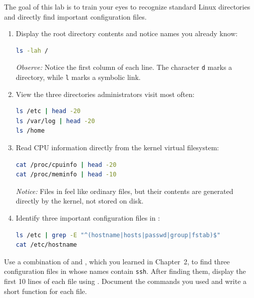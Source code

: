 The goal of this lab is to train your eyes to recognize standard Linux directories and directly find important configuration files.

\begin{enumerate}
    \item Display the root directory contents and notice names you already know:
\begin{lstlisting}[language=bash, caption={Viewing the root filesystem contents}]
ls -lah /
\end{lstlisting}
    \textit{Observe:} Notice the first column of each line. The character \texttt{d} marks a directory, while \texttt{l} marks a symbolic link.

    \item View the three directories administrators visit most often:
\begin{lstlisting}[language=bash, caption={Inspecting /etc, /var/log, and /home}]
ls /etc | head -20
ls /var/log | head -20
ls /home
\end{lstlisting}

    \item Read CPU information directly from the kernel virtual filesystem:
\begin{lstlisting}[language=bash, caption={Reading system information from /proc}]
cat /proc/cpuinfo | head -20
cat /proc/meminfo | head -10
\end{lstlisting}
    \textit{Notice:} Files in  feel like ordinary files, but their contents are generated directly by the kernel, not stored on disk.

    \item Identify three important configuration files in :
\begin{lstlisting}[language=bash, caption={Finding important configuration files with grep}]
ls /etc | grep -E "^(hostname|hosts|passwd|group|fstab)$"
cat /etc/hostname
\end{lstlisting}
\end{enumerate}

\begin{challengebox}
Use a combination of  and , which you learned in Chapter~2, to find three configuration files in  whose names contain \texttt{ssh}. After finding them, display the first 10 lines of each file using . Document the commands you used and write a short function for each file.
\end{challengebox}


